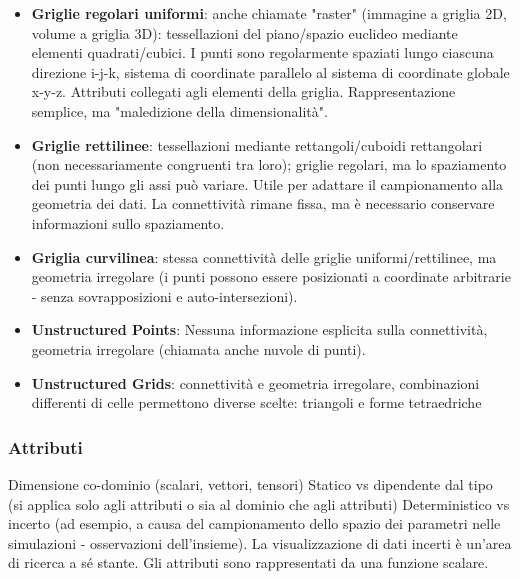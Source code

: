 \begin{itemize}
    \item \textbf{Griglie regolari uniformi}: anche chiamate "raster" (immagine a griglia 2D, volume a griglia 3D): tessellazioni del piano/spazio euclideo mediante elementi quadrati/cubici. I punti sono regolarmente spaziati lungo ciascuna direzione i-j-k, sistema di coordinate parallelo al sistema di coordinate globale x-y-z. Attributi collegati agli elementi della griglia. Rappresentazione semplice, ma "maledizione della dimensionalità".
    \item \textbf{Griglie rettilinee}: tessellazioni mediante rettangoli/cuboidi rettangolari (non necessariamente congruenti tra loro); griglie regolari, ma lo spaziamento dei punti lungo gli assi può variare. Utile per adattare il campionamento alla geometria dei dati. La connettività rimane fissa, ma è necessario conservare informazioni sullo spaziamento.
    \item \textbf{Griglia curvilinea}: stessa connettività delle griglie uniformi/rettilinee, ma geometria irregolare (i punti possono essere posizionati a coordinate arbitrarie - senza sovrapposizioni e auto-intersezioni).
    \item \textbf{Unstructured Points}: Nessuna informazione esplicita sulla connettività, geometria irregolare (chiamata anche nuvole di punti).
    \item \textbf{Unstructured Grids}: connettività e geometria irregolare, combinazioni differenti di celle permettono diverse scelte: triangoli e forme tetraedriche 
\end{itemize}
\subsubsection{Attributi}
Dimensione co-dominio (scalari, vettori, tensori)
Statico vs dipendente dal tipo (si applica solo agli attributi o sia al dominio che agli attributi)
Deterministico vs incerto (ad esempio, a causa del campionamento dello spazio dei parametri nelle simulazioni - osservazioni dell'insieme). La visualizzazione di dati incerti è un'area di ricerca a sé stante.
Gli attributi sono rappresentati da una funzione scalare.
